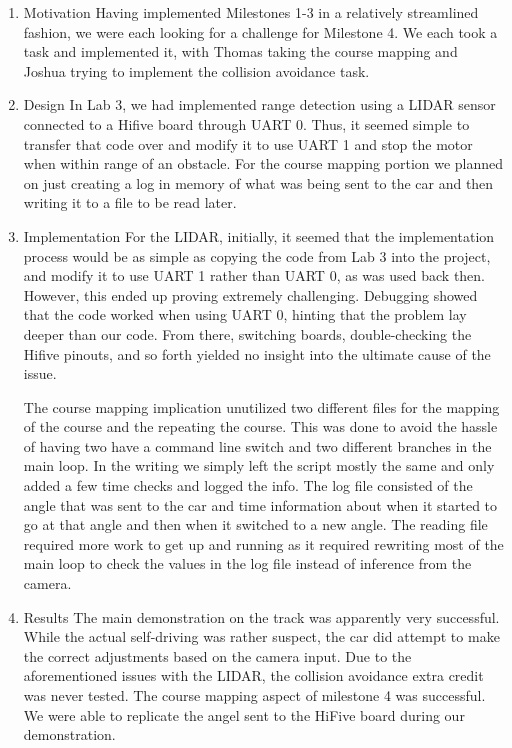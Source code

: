 \documentclass[11pt]{article}
\begin{document}
\begin{enumerate}
\item Motivation
\label{sec:org2371122}
Having implemented Milestones 1-3 in a relatively streamlined fashion, we
were each looking for a challenge for Milestone 4. We each took a task and
implemented it, with Thomas taking the course mapping and Joshua trying to
implement the collision avoidance task.

\item Design
\label{sec:org231b52b}
In Lab 3, we had implemented range detection using a LIDAR sensor connected
to a Hifive board through UART 0. Thus, it seemed simple to transfer that
code over and modify it to use UART 1 and stop the motor when within range of
an obstacle. For the course mapping portion we planned on just creating a log
in memory of what was being sent to the car and then writing it to a file to
be read later.

\item Implementation
\label{sec:orgb6c0902}
For the LIDAR, initially, it seemed that the implementation process would be
as simple as copying the code from Lab 3 into the project, and modify it to
use UART 1 rather than UART 0, as was used back then. However, this ended up
proving extremely challenging. Debugging showed that the code worked when
using UART 0, hinting that the problem lay deeper than our code. From there,
switching boards, double-checking the Hifive pinouts, and so forth yielded no
insight into the ultimate cause of the issue.

The course mapping implication unutilized two different files for the mapping of
the course and the repeating the course. This was done to avoid the hassle of
having two have a command line switch and two different branches in the main
loop. In the writing we simply left the script mostly the same and only added a
few time checks and logged the info. The log file consisted of the angle that
was sent to the car and time information about when it started to go at that
angle and then when it switched to a new angle. The reading file required more
work to get up and running as it required rewriting most of the main loop to
check the values in the log file instead of inference from the camera.

\item Results
\label{sec:org0bbc52a}
The main demonstration on the track was apparently very successful. While the
actual self-driving was rather suspect, the car did attempt to make the
correct adjustments based on the camera input. Due to the aforementioned
issues with the LIDAR, the collision avoidance extra credit was never
tested. The course mapping aspect of milestone 4 was successful. We were able
to replicate the angel sent to the HiFive board during our demonstration.


\end{enumerate}
\end{document}
